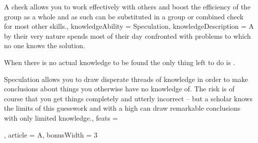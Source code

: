 {A  check allows you to work effectively with others\comma{} and boost the efficiency of the group as a whole\comma{} and as such can be substituted in a group or combined check for most other skills.,
	knowledgeAbility = Speculation,
	knowledgeDescription = A \bname{}\comma{} by their very nature\comma{} spends most of their day confronted with problems to which no one knows the solution. 

When there is no actual knowledge to be found\comma{} the only thing left to do is . 

Speculation allows you to draw disperate threads of knowledge\comma{} in order to make conclusions about things you otherwise have no knowledge of. The risk is\comma{} of course\comma{} that you get things completely and utterly incorrect – but a scholar knows the limits of this guesswork\comma{} and with a high  can draw remarkable conclusions with only limited knowledge.,
	feats = 




,
	article = A,
	bonusWidth = 3
}

